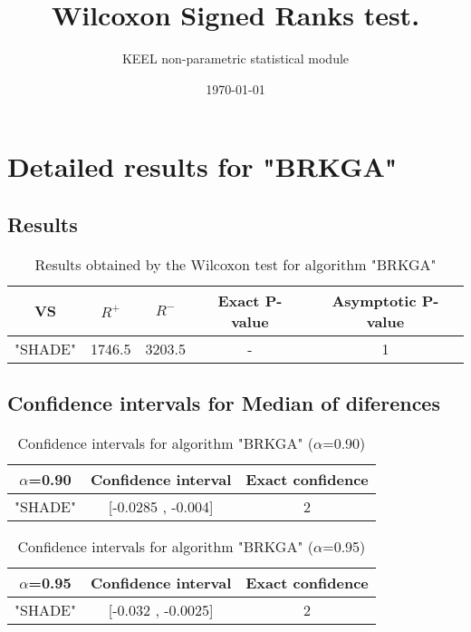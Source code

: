 \documentclass[a4paper,10pt]{article}
\title{Wilcoxon Signed Ranks test.}
\date{\today}
\author{KEEL non-parametric statistical module}
\begin{document}
\pagestyle{empty}
\maketitle
\thispagestyle{empty}



\section{Detailed results for "BRKGA"}


\subsection{Results}

\begin{table}[!htp]
\centering\small
\begin{tabular}{
|c|c|c|c|c|}
\hline
 VS & $R^{+}$ & $R^{-}$ & Exact P-value & Asymptotic P-value \\ \hline 
"SHADE" & 1746.5 & 3203.5 & - & 1\\ \hline 

\end{tabular}
\caption{Results obtained by the Wilcoxon test for algorithm "BRKGA"}
\end{table}

\subsection{Confidence intervals for Median of diferences}

\begin{table}[!htp]
\centering\small
\begin{tabular}{
|c|c|c|}
\hline
 $\alpha$=0.90 & Confidence interval & Exact confidence \\ \hline 
"SHADE" & [-0.0285 , -0.004] & 2\\ \hline 

\end{tabular}
\caption{Confidence intervals for algorithm "BRKGA" ($\alpha$=0.90)}
\end{table}
\begin{table}[!htp]
\centering\small
\begin{tabular}{
|c|c|c|}
\hline
 $\alpha$=0.95 & Confidence interval & Exact confidence \\ \hline 
"SHADE" & [-0.032 , -0.0025] & 2\\ \hline 

\end{tabular}
\caption{Confidence intervals for algorithm "BRKGA" ($\alpha$=0.95)}
\end{table}
\end{document}
